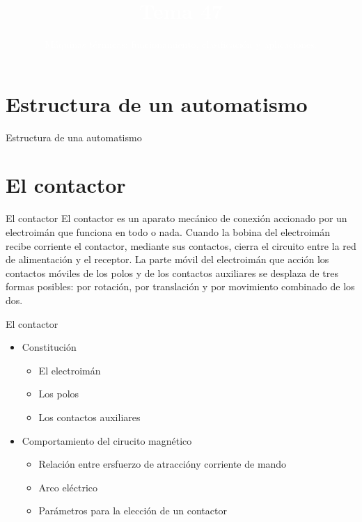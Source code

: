 \documentclass{beamer}
\title{\textcolor{white}{Tema 47}}
\subtitle{\textcolor{white}{Máquinas térmicas: funcionamiento, clasificación y aplicaciones.}}
\begin{document}
\begin{frame}[plain,t]
\titlepage
\end{frame}



\section{Estructura de un automatismo}
\begin{frame}{Estructura de una automatismo}

\end{frame}


\section{El contactor}
\begin{frame}{El contactor}
    El contactor es un aparato mecánico de conexión accionado por un electroimán que funciona en todo o nada. Cuando la bobina del electroimán recibe corriente el contactor, mediante sus contactos, cierra el circuito entre la red de alimentación y el receptor. La parte móvil del electroimán que acción los contactos móviles de los polos y de los contactos auxiliares se desplaza de tres formas posibles: por rotación, 
    por translación y por movimiento combinado de los dos.
\end{frame}

\begin{frame}{El contactor}
    \begin{itemize}
        \item Constitución\begin{itemize}
            \item El electroimán
            \item Los polos
            \item Los contactos auxiliares
        \end{itemize}
        \item Comportamiento del cirucito magnético\begin{itemize}
            \item Relación entre ersfuerzo de atraccióny corriente de mando
            \item Arco eléctrico
            \item Parámetros para la elección de un contactor
        \end{itemize}
    \end{itemize}

\end{frame}
\end{document}
